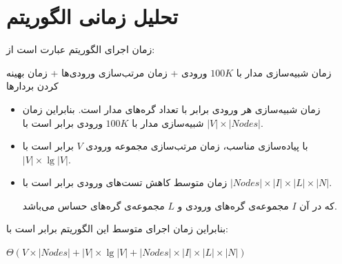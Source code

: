 \section{تحلیل زمانی الگوریتم}
زمان اجرای الگوریتم  عبارت است از:

\begin{center}
	زمان شبیه‌سازی مدار با $100K$ ورودی + زمان مرتب‌سازی ورودی‌ها + زمان بهینه کردن بردارها
\end{center}

\begin{itemize}
	
\item
زمان شبیه‌سازی هر ورودی برابر با تعداد گره‌های مدار است. بنابراین زمان شبیه‌سازی مدار با $100K$ ورودی برابر است با
$|V|\times|Nodes|$.
\item
با پیاده‌سازی مناسب، زمان مرتب‌سازی مجموعه ورودی $V$ برابر است با 
$|V|\times \lg⁡|V|$.
\item
زمان متوسط کاهش تست‌های ورودی برابر است با
$|Nodes|\times|I|\times|L|\times |N|$.

که در آن $I$ مجموعه‌ی گره‌های ورودی و $L$ مجموعه‌ی گره‌های حساس می‌باشد.
\end{itemize}	
بنابراین زمان اجرای متوسط این الگوریتم برابر است با:
\begin{center}
	$\Theta(V\times|Nodes|  +|V|\times\lg⁡|V|+|Nodes|\times|I|\times|L|\times|N|)$
\end{center}






